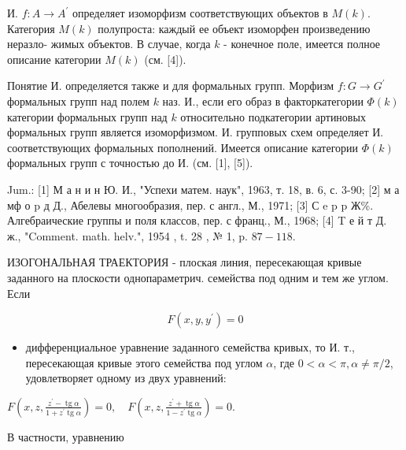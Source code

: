 \documentclass[10pt]{article}
\begin{document}
И. $f: A \rightarrow A^{\prime}$ определяет изоморфизм соответствующих объектов в $M(k)$. Категория $M(k)$ полупроста: каждый ее объект изоморфен произведению неразло- жимых объектов. В случае, когда $k$ - конечное поле, имеется полное описание категории $M(k)$ (см. [4]).



Понятие И. определяется также и для формальных групп. Морфизм $f: G \rightarrow G^{\prime}$ формальных групп над полем $k$ наз. И., если его образ в факторкатегории $\Phi(k)$ категории формальных групп над $k$ относительно подкатегории артиновых формальных групп является изоморфизмом. И. групповых схем определяет И. соответствующих формальных пополнений. Имеется описание категории $\Phi(k)$ формальных групп с точностью до И. (см. [1], [5]).



Jum.: [1] М а н и н Ю. И., "Успехи матем. наук", 1963, т. 18, в. 6, с. 3-90; [2] м а мф о p д Д., Абелевы многообразия, пер. с англ., М., 1971; [3] С e p p Ж\%. Алгебраические группы и поля классов, пер. с франц., М., 1968; [4] T е й т Д. ж., "Comment. math. helv.", 1954 , t. 28 , № 1, p. $87-118$.



ИЗОГОНАЛЬНАЯ ТРАЕКТОРИЯ - плоская линия, пересекающая кривые заданного на плоскости однопараметрич. семейства под одним и тем же углом. Если



\[

F\left(x, y, y^{\prime}\right)=0

\]



\begin{itemize}

  \item дифференциальное уравнение заданного семейства кривых, то И. т., пересекающая кривые этого семейства под углом $\alpha$, где $0<\alpha<\pi, \alpha \neq \pi / 2$, удовлетворяет одному из двух уравнений:

\end{itemize}



$F\left(x, z, \frac{z^{\prime}-\operatorname{tg} \alpha}{1+z^{\prime} \operatorname{tg} \alpha}\right)=0, \quad F\left(x, z, \frac{z^{\prime}+\operatorname{tg} \alpha}{1-z^{\prime} \operatorname{tg} \alpha}\right)=0$.



В частности, уравнению
\end{document}

